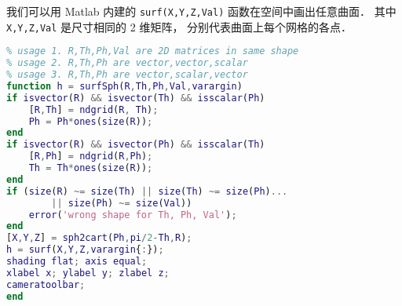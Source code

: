 
我们可以用 Matlab 内建的 \verb|surf(X,Y,Z,Val)| 函数在空间中画出任意曲面． 其中 \verb|X,Y,Z,Val| 是尺寸相同的 2 维矩阵， 分别代表曲面上每个网格的各点．
\begin{lstlisting}[language=matlab]
% surf() in spherical coordinate
% usage 1. R,Th,Ph,Val are 2D matrices in same shape
% usage 2. R,Th,Ph are vector,vector,scalar
% usage 3. R,Th,Ph are vector,scalar,vector
function h = surfSph(R,Th,Ph,Val,varargin)
if isvector(R) && isvector(Th) && isscalar(Ph)
    [R,Th] = ndgrid(R, Th);
    Ph = Ph*ones(size(R));
end
if isvector(R) && isvector(Ph) && isscalar(Th)
    [R,Ph] = ndgrid(R,Ph);
    Th = Th*ones(size(R));
end
if (size(R) ~= size(Th) || size(Th) ~= size(Ph)...
        || size(Ph) ~= size(Val))
    error('wrong shape for Th, Ph, Val');
end
[X,Y,Z] = sph2cart(Ph,pi/2-Th,R);
h = surf(X,Y,Z,varargin{:});
shading flat; axis equal;
xlabel x; ylabel y; zlabel z;
cameratoolbar;
end
\end{lstlisting}
